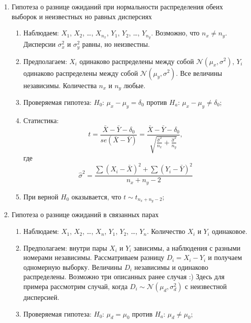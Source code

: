 \documentclass[12pt, a4paper]{article}
\newcommand{\cN}{\mathcal{N}}
\begin{document}
\begin{enumerate}[resume]
\begin{enumerate}
    \item При верной $H_0$ оказывается, что $Z \sim \cN(0;1)$;
\end{enumerate}


  \item Гипотеза о разнице ожиданий при нормальности распределения обеих выборок и неизвестных но равных дисперсиях
    \begin{enumerate}
      \item Наблюдаем: $X_1$, $X_2$, \ldots, $X_{n_x}$, $Y_1$, $Y_2$, \ldots, $Y_{n_y}$.
	Возможно, что $n_x \neq n_y$. Дисперсии $\sigma^2_x$ и $\sigma^2_y$ равны, но неизвестны.
      \item Предполагаем: $X_i$ одинаково распределены между собой $\cN(\mu_x, \sigma^2)$,
	$Y_i$ одинаково распределены между собой $\cN(\mu_y, \sigma^2)$.
	Все величины независимы. Количества $n_x$ и $n_y$ любые.
      \item Проверяемая гипотеза: $H_0$: $\mu_x - \mu_y = \delta_0$ против $H_a$: $\mu_x - \mu_y \neq \delta_0$;

     \item Статистика:
	\[
	  t = \frac{\bar X - \bar Y - \delta_0}{se(\bar X - \bar Y)} =
	  \frac{\bar X - \bar Y - \delta_0}{\sqrt{\frac{\hat \sigma^2}{n_x}+\frac{\hat\sigma^2}{n_y}}},
      \]
      где
      \[
	\hat \sigma^2 = \frac{\sum (X_i - \bar X)^2 + \sum (Y_i - \bar Y)^2 }{n_x + n_y - 2}
      \]

    \item При верной $H_0$ оказывается, что $t \sim t_{n_x+n_y-2}$;
\end{enumerate}


  \item Гипотеза о разнице ожиданий в связанных парах
    \begin{enumerate}
      \item Наблюдаем: $X_1$, $X_2$, \ldots, $X_n$, $Y_1$, $Y_2$, \ldots, $Y_n$.
	Количество $X_i$ и $Y_i$ одинаковое.
      \item Предполагаем: внутри пары $X_i$ и $Y_i$ зависимы, а наблюдения с разными номерами независимы.
	Рассматриваем разницу $D_i = X_i - Y_i$ и получаем одномерную выборку.
	Величины $D_i$ независимы и одинаково распределены.
	Возможно три описанных ранее случая :)
	Здесь для примера рассмотрим случай, когда $D_i \sim \cN(\mu_d, \sigma^2_d)$ с неизвестной дисперсией.

      \item Проверяемая гипотеза: $H_0$: $\mu_d = \mu_0$ против $H_a$: $\mu_d \neq \mu_0$;


\end{enumerate}
\end{enumerate}
\end{document}
